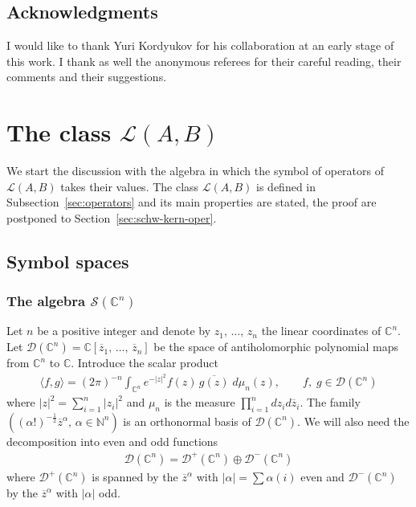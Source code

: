 \documentclass[10pt,a4paper]{article}
\theoremstyle{definition}
\numberwithin{equation}{section}
\newcommand{\N}{{\mathbb{N}}}
\newcommand{\C}{{\mathbb{C}}}
\newcommand{\al}{{\alpha}}
\newcommand{\con}{\overline}
\newcommand{\D}{\mathcal{D}}
\newcommand{\symb}{\mathcal{S}}
\newcommand{\lag}{\mathcal{L}}
\begin{document}
\subsection*{Acknowledgments}
I would like to thank Yuri Kordyukov for his collaboration at an early stage of this work. I thank as well the anonymous referees for their careful reading, their comments and their suggestions.




\section{The class \texorpdfstring{$\lag (A,B)$}{L(A,B)}} \label{sec:class-lag-pres}

We start the discussion with the algebra in which the symbol of operators of $\lag (A, B)$ takes their values. The class $\lag (A,B)$ is defined in Subsection~\ref{sec:operators}  and its main properties are stated, the proof are postponed to Section~\ref{sec:schw-kern-oper}. 

\subsection{Symbol spaces} \label{sec:symbol-spaces}

\subsubsection{The algebra $\symb (\C^n)$}
Let $n$ be a positive integer and denote by $z_1,\, \ldots,\, z_n$ the linear coordinates of $\C^n$. Let $\D (\C^n)= \C [\con{z}_1, \,\ldots,\, \con{z}_n]$ be the space of antiholomorphic polynomial maps from $\C^n$ to $\C$. Introduce the scalar product
\begin{gather}\label{eq:scal_product_bargm}
\langle f, g \rangle = (2\pi)^{-n}\int_{\C^n} e^{-|z|^2} f (z)\, \con{g (z)} \; d \mu_n (z), \qquad f,\; g \in \D (\C^n)
\end{gather}
where $|z|^2 = \sum_{i=1}^n |z_i|^2$ and $ \mu_n $ is the measure $\prod_{i=1}^n dz_i d\con{z}_i$. The family $((\al !)^{-\frac{1}{2}} \con{z}^\al, \, \al \in
\N^n)$ is an orthonormal basis of $\D (\C^n)$. We will also need the decomposition into even and odd functions
\begin{gather}\label{eq:paire_impaire}
\D (\C^n) = \D^+ (\C^n) \oplus \D ^{-} (\C^n)
\end{gather}
where $ \D^+ (\C^n) $ is spanned by the $\con{z}^\al$ with $|\al| = \sum \al(i)$ even and $\D ^{-} (\C^n) $ by the $\con{z}^\al$ with $|\al|$ odd.
\end{document}
